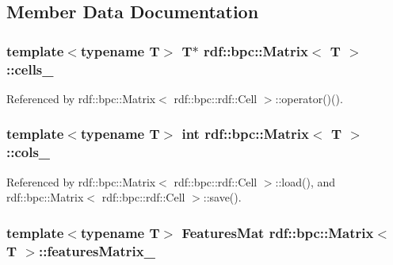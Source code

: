 \subsection{Member Data Documentation}
\subsubsection[{\texorpdfstring{cells\+\_\+}{cells_}}]{\setlength{\rightskip}{0pt plus 5cm}template$<$typename T$>$ T$\ast$ {\bf rdf\+::bpc\+::\+Matrix}$<$ T $>$\+::cells\+\_\+\hspace{0.3cm}{\ttfamily [private]}}\hypertarget{classrdf_1_1bpc_1_1Matrix_adebf06eb7c44da98fd103edfb17988f1}{}\label{classrdf_1_1bpc_1_1Matrix_adebf06eb7c44da98fd103edfb17988f1}


Referenced by rdf\+::bpc\+::\+Matrix$<$ rdf\+::bpc\+::rdf\+::\+Cell $>$\+::operator()().

\subsubsection[{\texorpdfstring{cols\+\_\+}{cols_}}]{\setlength{\rightskip}{0pt plus 5cm}template$<$typename T$>$ int {\bf rdf\+::bpc\+::\+Matrix}$<$ T $>$\+::cols\+\_\+\hspace{0.3cm}{\ttfamily [private]}}\hypertarget{classrdf_1_1bpc_1_1Matrix_a2a15ca3ef49e2f0c7724e5c556878b3c}{}\label{classrdf_1_1bpc_1_1Matrix_a2a15ca3ef49e2f0c7724e5c556878b3c}


Referenced by rdf\+::bpc\+::\+Matrix$<$ rdf\+::bpc\+::rdf\+::\+Cell $>$\+::load(), and rdf\+::bpc\+::\+Matrix$<$ rdf\+::bpc\+::rdf\+::\+Cell $>$\+::save().

\subsubsection[{\texorpdfstring{features\+Matrix\+\_\+}{featuresMatrix_}}]{\setlength{\rightskip}{0pt plus 5cm}template$<$typename T$>$ {\bf Features\+Mat} {\bf rdf\+::bpc\+::\+Matrix}$<$ T $>$\+::features\+Matrix\+\_\+}\hypertarget{classrdf_1_1bpc_1_1Matrix_a635849575c43df7969d5328cede7a040}{}\label{classrdf_1_1bpc_1_1Matrix_a635849575c43df7969d5328cede7a040}


